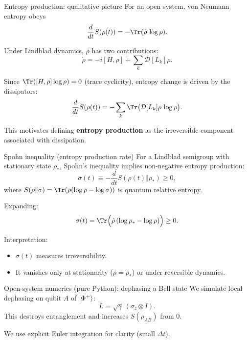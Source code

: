 \documentclass[aspectratio=169]{beamer}
\begin{document}
\begin{frame}{Entropy production: qualitative picture}
For an open system, von Neumann entropy obeys
\[
\frac{d}{dt}S(\rho(t)) = -\Tr(\dot{\rho}\,\log\rho).
\]

\medskip
Under Lindblad dynamics, $\dot{\rho}$ has two contributions:
\[
\dot{\rho}= -i[H,\rho] + \sum_k \mathcal{D}[L_k]\rho.
\]

\medskip
Since $\Tr([H,\rho]\log\rho)=0$ (trace cyclicity), entropy change is driven by the dissipators:
\[
\frac{d}{dt}S(\rho(t)) = -\sum_k \Tr\big(\mathcal{D}[L_k]\rho \,\log\rho\big).
\]

\medskip
This motivates defining \textbf{entropy production} as the irreversible component associated with dissipation.
\end{frame}

\begin{frame}{Spohn inequality (entropy production rate)}
For a Lindblad semigroup with stationary state $\rho_\ast$,
Spohn's inequality implies non-negative entropy production:
\[
\sigma(t) \equiv -\frac{d}{dt}S(\rho(t)\Vert \rho_\ast) \ge 0,
\]
where $S(\rho\Vert\sigma)=\Tr(\rho(\log\rho-\log\sigma))$ is quantum relative entropy.

\medskip
Expanding:
\[
\sigma(t) = \Tr\Big(\dot{\rho}\,(\log\rho_\ast-\log\rho)\Big)\ge 0.
\]

\medskip
Interpretation:
\begin{itemize}
\item $\sigma(t)$ measures irreversibility.
\item It vanishes only at stationarity ($\rho=\rho_\ast$) or under reversible dynamics.
\end{itemize}
\end{frame}

\begin{frame}[fragile]{Open-system numerics (pure Python): dephasing a Bell state}
We simulate local dephasing on qubit $A$ of $\ket{\Phi^+}$:
\[
L=\sqrt{\gamma}\,(\sigma_z\otimes I).
\]
This destroys entanglement and increases $S(\rho_{AB})$ from 0.

\medskip
We use explicit Euler integration for clarity (small $\Delta t$).
\end{frame}
\end{document}

